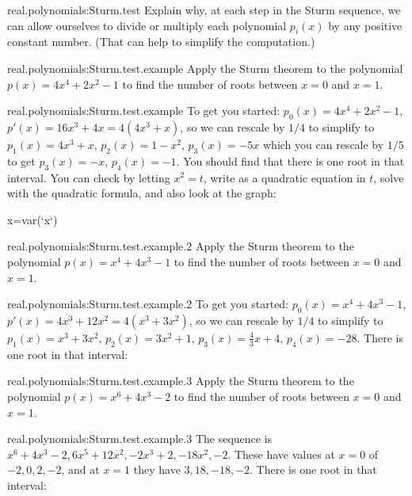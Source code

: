 \begin{problem}{real.polynomials:Sturm.test}
Explain why, at each step in the Sturm sequence, we can allow ourselves to divide or multiply each polynomial \(p_i(x)\) by any positive constant number. (That can help to simplify the computation.)
\end{problem}
\begin{problem}{real.polynomials:Sturm.test.example}
Apply the Sturm theorem to the polynomial \(p(x)=4x^4+2x^2-1\) to find the number of roots between \(x=0\) and \(x=1\).
\end{problem}
\begin{answer}{real.polynomials:Sturm.test.example}
To get you started: \(p_0(x)=4x^4+2x^2-1\), \(p'(x)=16x^3+4x=4(4x^3+x)\), so we can rescale by \(1/4\) to simplify to \(p_1(x)=4x^3+x\), \(p_2(x)=1-x^2\), \(p_3(x)=-5x\) which you can rescale by \(1/5\) to get \(p_3(x)=-x\), \(p_4(x)=-1\).
You should find that there is one root in that interval. You can check by letting \(x^2=t\), write as a quadratic equation in \(t\), solve with the quadratic formula, and also look at the graph:
\begin{center}
\begin{sagesilent}
x=var(`x`)
\end{sagesilent}
\end{center}
\end{answer}
\begin{problem}{real.polynomials:Sturm.test.example.2}
Apply the Sturm theorem to the polynomial \(p(x)=x^4+4x^3-1\) to find the number of roots between \(x=0\) and \(x=1\).
\end{problem}
\begin{answer}{real.polynomials:Sturm.test.example.2}
To get you started: \(p_0(x)=x^4+4x^3-1\), \(p'(x)=4x^3 + 12x^2=4(x^3+3x^2)\), so we can rescale by \(1/4\) to simplify to \(p_1(x)=x^3+3x^2\), \(p_2(x)=3x^2 + 1\), \(p_3(x)=\frac{4}{3}x + 4\), \(p_4(x)= -28\).
There is one root in that interval:
\begin{center}
\end{center}
\end{answer}
\begin{problem}{real.polynomials:Sturm.test.example.3}
Apply the Sturm theorem to the polynomial \(p(x)=x^6+4x^3-2\) to find the number of roots between \(x=0\) and \(x=1\).
\end{problem}
\begin{answer}{real.polynomials:Sturm.test.example.3}
The sequence is \(x^6+4x^3-2, 6x^5+12x^2, -2x^3+2, -18x^2, -2\). 
These have values at \(x=0\) of \(-2, 0, 2, -2\), and at \(x=1\) they have \(3, 18, -18, -2\).
There is one root in that interval:
\begin{center}
\end{center}
\end{answer}
